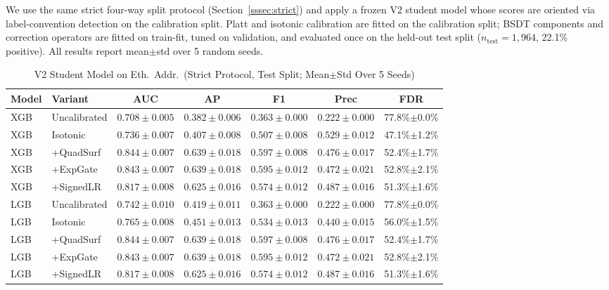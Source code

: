 \documentclass[journal]{IEEEtran}
\begin{document}
We use the same strict four-way split protocol (Section~\ref{sssec:strict}) and apply a frozen V2 student model whose scores are oriented via label-convention detection on the calibration split. Platt and isotonic calibration are fitted on the calibration split; BSDT components and correction operators are fitted on train-fit, tuned on validation, and evaluated once on the held-out test split ($n_{\text{test}} = 1{,}964$, 22.1\% positive). All results report mean$\pm$std over 5 random seeds.

\begin{table}[!t]
\centering
\caption{V2 Student Model on Eth.\ Addr.\ (Strict Protocol, Test Split; Mean$\pm$Std Over 5 Seeds)}
\label{tab:external_eth}
\setlength{\tabcolsep}{3pt}
\begin{tabular}{@{}llccccc@{}}
\toprule
\textbf{Model} & \textbf{Variant} & \textbf{AUC} & \textbf{AP} & \textbf{F1} & \textbf{Prec} & \textbf{FDR} \\
\midrule
XGB & Uncalibrated    & $0.708{\pm}0.005$ & $0.382{\pm}0.006$ & $0.363{\pm}0.000$ & $0.222{\pm}0.000$ & 77.8\%$\pm$0.0\% \\
XGB & Isotonic        & $0.736{\pm}0.007$ & $0.407{\pm}0.008$ & $0.507{\pm}0.008$ & $0.529{\pm}0.012$ & 47.1\%$\pm$1.2\% \\
XGB & +QuadSurf       & $\mathbf{0.844{\pm}0.007}$ & $\mathbf{0.639{\pm}0.018}$ & $0.597{\pm}0.008$ & $0.476{\pm}0.017$ & 52.4\%$\pm$1.7\% \\
XGB & +ExpGate        & $0.843{\pm}0.007$ & $0.639{\pm}0.018$ & $\mathbf{0.595{\pm}0.012}$ & $0.472{\pm}0.021$ & 52.8\%$\pm$2.1\% \\
XGB & +SignedLR       & $0.817{\pm}0.008$ & $0.625{\pm}0.016$ & $0.574{\pm}0.012$ & $0.487{\pm}0.016$ & 51.3\%$\pm$1.6\% \\
\midrule
LGB & Uncalibrated    & $0.742{\pm}0.010$ & $0.419{\pm}0.011$ & $0.363{\pm}0.000$ & $0.222{\pm}0.000$ & 77.8\%$\pm$0.0\% \\
LGB & Isotonic        & $0.765{\pm}0.008$ & $0.451{\pm}0.013$ & $0.534{\pm}0.013$ & $0.440{\pm}0.015$ & 56.0\%$\pm$1.5\% \\
LGB & +QuadSurf       & $\mathbf{0.844{\pm}0.007}$ & $\mathbf{0.639{\pm}0.018}$ & $0.597{\pm}0.008$ & $0.476{\pm}0.017$ & 52.4\%$\pm$1.7\% \\
LGB & +ExpGate        & $0.843{\pm}0.007$ & $0.639{\pm}0.018$ & $\mathbf{0.595{\pm}0.012}$ & $0.472{\pm}0.021$ & 52.8\%$\pm$2.1\% \\
LGB & +SignedLR       & $0.817{\pm}0.008$ & $0.625{\pm}0.016$ & $0.574{\pm}0.012$ & $0.487{\pm}0.016$ & 51.3\%$\pm$1.6\% \\
\bottomrule
\end{tabular}
\end{table}
\end{document}

